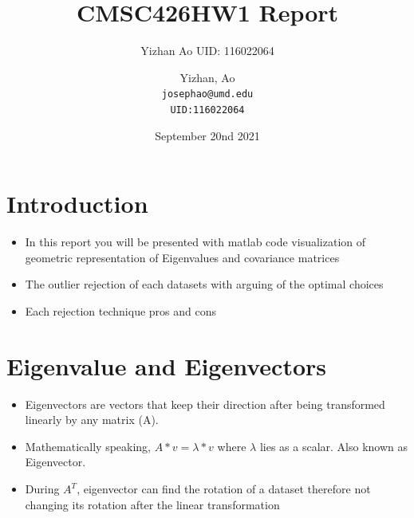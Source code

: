 \documentclass{article}
\title{CMSC426HW1 Report}
\author{Yizhan Ao UID: 116022064}
\author{
  Yizhan, Ao\\
  \texttt{josephao@umd.edu}\\
  \texttt{UID:116022064}
}
\date{September 20nd 2021}
\begin{document}
\maketitle

\section{Introduction}

\begin{itemize}
    \item In this report you will be presented with matlab code visualization of geometric representation of Eigenvalues and covariance matrices
    \item The outlier rejection of each datasets with arguing of the optimal choices 
    \item Each rejection technique pros and cons
\end{itemize}

\section{Eigenvalue and Eigenvectors}
\begin{itemize}
    \item Eigenvectors are  vectors that keep their direction after being transformed linearly by any matrix (A). 
    \item Mathematically speaking, $A*v = \lambda*v$ where $\lambda$ lies as a scalar. Also known as Eigenvector.
    \item During $A^T$, eigenvector can find the rotation of a dataset therefore not changing its rotation after the linear transformation 
\end{itemize}
\end{document}
